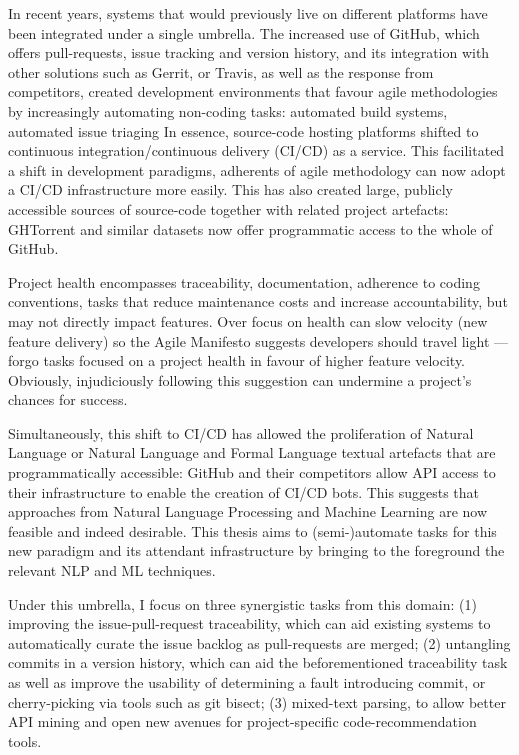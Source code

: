 In recent years, systems that would previously live on different platforms have
been integrated under a single umbrella. The increased use of GitHub, which
offers pull-requests, issue tracking and version history, and its integration
with other solutions such as Gerrit, or Travis, as well as the response from
competitors, created development environments that favour agile methodologies by
increasingly automating non-coding tasks: automated build systems, automated
issue triaging \etc In essence, source-code hosting platforms shifted to
continuous integration/continuous delivery (CI/CD) as a service. This
facilitated a shift in development paradigms, adherents of agile methodology can
now adopt a CI/CD infrastructure more easily. This has also created large,
publicly accessible sources of source-code together with related project
artefacts: GHTorrent and similar datasets now offer programmatic access to the
whole of GitHub.

Project health encompasses traceability, documentation, adherence to coding
conventions, tasks that reduce maintenance costs and increase accountability,
but may not directly impact features.  Over focus on health can slow velocity
(new feature delivery) so the Agile Manifesto suggests developers should travel
light --- forgo tasks focused on a project health in favour of higher feature
velocity. Obviously, injudiciously following this suggestion can undermine a
project's chances for success.

Simultaneously, this shift to CI/CD has allowed the proliferation of Natural
Language or Natural Language and Formal Language textual artefacts that are
programmatically accessible: GitHub and their competitors allow API access to
their infrastructure to enable the creation of CI/CD bots. This suggests that
approaches from Natural Language Processing and Machine Learning are now
feasible and indeed desirable. This thesis aims to (semi-)automate tasks for
this new paradigm and its attendant infrastructure by bringing to the foreground
the relevant NLP and ML techniques.

Under this umbrella, I focus on three synergistic tasks from this domain: (1)
improving the issue-pull-request traceability, which can aid existing systems to
automatically curate the issue backlog as pull-requests are merged; (2)
untangling commits in a version history, which can aid the beforementioned
traceability task as well as improve the usability of determining a fault
introducing commit, or cherry-picking via tools such as git bisect; (3)
mixed-text parsing, to allow better API mining and open new avenues for
project-specific code-recommendation tools.